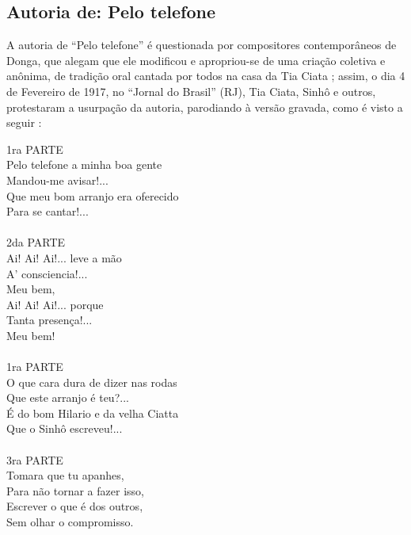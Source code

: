 \subsection{Autoria de: Pelo telefone}

A autoria de ``Pelo telefone'' é questionada por compositores contemporâneos de Donga, que alegam que
ele modificou e apropriou-se de uma criação coletiva e anônima, 
de tradição oral cantada por todos na casa da Tia Ciata \cite{musicapelotelefone} \cite[pp. 35]{diniz2006almanaque} \cite[pp. 49]{diniz2008almanaque};
assim, o dia 4 de Fevereiro de 1917, no ``Jornal do Brasil'' (RJ), Tia Ciata, Sinhô e outros,
protestaram a usurpação da autoria, parodiando à versão gravada, como é visto a seguir \cite[pp. 17]{TiaCiataVsDonga} \cite[pp. 118-119]{sandroni2001feitico}:
\begin{citando}%
\begin{center}
1ra PARTE\\
Pelo telefone a minha boa gente\\
Mandou-me avisar!...\\
Que meu bom arranjo era oferecido\\
Para se cantar!...\\
~\\
2da PARTE\\
Ai! Ai! Ai!... leve a mão\\
A' consciencia!...\\
Meu bem,\\
Ai! Ai! Ai!... porque\\
Tanta presença!...\\
Meu bem!\\
~\\
1ra PARTE\\
O que cara dura de dizer nas rodas\\
Que este arranjo é teu?...\\
É do bom Hilario e da velha Ciatta\\
Que o Sinhô escreveu!...\\
~\\
3ra PARTE\\
Tomara que tu apanhes,\\
Para não tornar a fazer isso,\\
Escrever o que é dos outros,\\
Sem olhar o compromisso.
\end{center}
\end{citando}%

